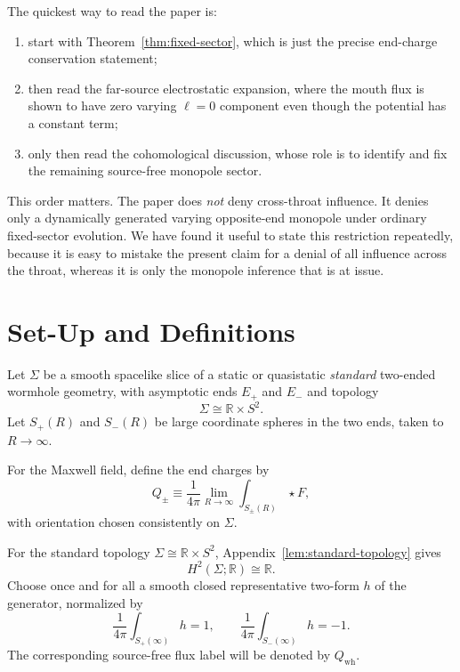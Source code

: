 \documentclass[aps,prd,onecolumn,nofootinbib,superscriptaddress]{revtex4-2}
\begin{document}
The quickest way to read the paper is:
\begin{enumerate}
    \item start with Theorem~\ref{thm:fixed-sector}, which is just the precise end-charge conservation statement;
    \item then read the far-source electrostatic expansion, where the mouth flux is shown to have zero varying $\ell=0$ component even though the potential has a constant term;
    \item only then read the cohomological discussion, whose role is to identify and fix the remaining source-free monopole sector.
\end{enumerate}

This order matters. The paper does \emph{not} deny cross-throat influence. It denies only a dynamically generated varying opposite-end monopole under ordinary fixed-sector evolution. We have found it useful to state this restriction repeatedly, because it is easy to mistake the present claim for a denial of all influence across the throat, whereas it is only the monopole inference that is at issue.

\section{Set-Up and Definitions}

Let $\Sigma$ be a smooth spacelike slice of a static or quasistatic \emph{standard} two-ended wormhole geometry, with asymptotic ends $E_{+}$ and $E_{-}$ and topology
\begin{equation}
\Sigma \cong \mathbb{R}\times S^2.
\end{equation}
Let $S_{+}(R)$ and $S_{-}(R)$ be large coordinate spheres in the two ends, taken to $R \to \infty$.

For the Maxwell field, define the end charges by
\begin{equation}
Q_{\pm} \equiv \frac{1}{4\pi}\lim_{R\to\infty}\int_{S_{\pm}(R)} \star F,
\end{equation}
with orientation chosen consistently on $\Sigma$.

For the standard topology $\Sigma\cong\mathbb{R}\times S^2$, Appendix~\ref{lem:standard-topology} gives
\begin{equation}
H^2(\Sigma;\mathbb{R})\cong \mathbb{R}.
\end{equation}
Choose once and for all a smooth closed representative two-form $h$ of the generator, normalized by
\begin{equation}
\frac{1}{4\pi}\int_{S_{+}(\infty)} h = 1,
\qquad
\frac{1}{4\pi}\int_{S_{-}(\infty)} h = -1.
\end{equation}
The corresponding source-free flux label will be denoted by $Q_{\mathrm{wh}}$.
\end{document}
